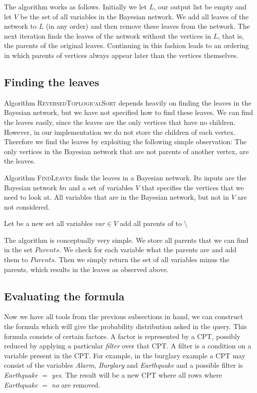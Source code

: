 \documentclass[10pt,a4paper]{article}
\begin{document}
The algorithm works as follows. Initially we let $L$, our output list be empty and let $V$ be the set of all variables in the Bayesian network. We add all leaves of the network to $L$ (in any order) and then remove these leaves from the network. The next iteration finds the leaves of the network without the vertices in $L$, that is, the parents of the original leaves. Continuing in this fashion leads to an ordering in which parents of vertices always appear later than the vertices themselves.

\subsection{Finding the leaves}
Algorithm \textsc{ReversedToplogicalSort} depends heavily on finding the leaves in the Bayesian network, but we have not specified how to find these leaves. We can find the leaves easily, since the leaves are the only vertices that have no children. However, in our implementation we do not store the children of each vertex. Therefore we find the leaves by exploiting the following simple observation: The only vertices in the Bayesian network that are not parents of another vertex, are the leaves. 

Algorithm \textsc{FindLeaves} finds the leaves in a Bayesian network. Its inputs are the Bayesian network $bn$ and a set of variables $V$ that specifies the vertices that we need to look at. All variables that are in the Bayesian network, but not in $V$ are not considered.

\begin{codebox}
\li Let  be a new set
\li \For all variables $var \in V$ \Do 
\li	add all parents of  to 
\End
\li \Return {} $\setminus$ 
\end{codebox}

The algorithm is conceptually very simple. We store all parents that we can find in the set $Parents$. We check for each variable what the parents are and add them to $Parents$. Then we simply return the set of all variables minus the parents, which results in the leaves as observed above.

\subsection{Evaluating the formula}
Now we have all tools from the previous subsections in hand, we can construct the formula which will give the probability distribution asked in the query. This formula consists of certain factors. A factor is represented by a CPT, possibly reduced by applying a particular \emph{filter} over that CPT. A filter is a condition on a variable present in the CPT. For example, in the burglary example a CPT may consist of the variables \emph{Alarm}, \emph{Burglary} and \emph{Earthquake} and a possible filter is \emph{Earthquake} $=$ \emph{yes}. The result will be a new CPT where all rows where \emph{Earthquake} $=$ \emph{no} are removed.
\end{document}

